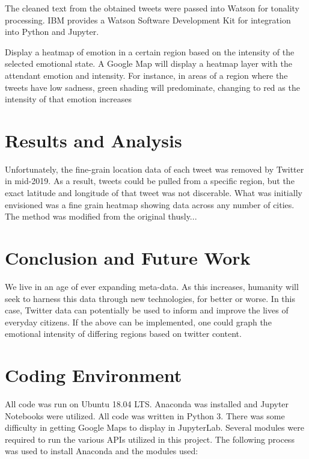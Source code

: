 \documentclass[12pt, oneside]{article}
\begin{document}
The cleaned text from the obtained tweets were passed into Watson for tonality
processing. IBM provides a Watson Software Development Kit for integration into
Python and Jupyter. 

Display a heatmap of emotion in a certain region based on the intensity
of the selected emotional state. A Google
Map will display a heatmap layer with the attendant emotion and intensity. For
instance, in areas of a region where the tweets have low sadness, green shading
will predominate, changing to red as the intensity of that emotion increases


\section{Results and Analysis}
Unfortunately, the fine-grain location data of
each tweet was removed by Twitter in mid-2019. As a result, tweets could be
pulled from a specific region, but the exact latitude and longitude of that
tweet was not discerable. What was initially envisioned was a fine grain heatmap
showing data across any number of cities. The method was modified from the original thusly...

\section{Conclusion and Future Work}
We live in an age of ever expanding meta-data. As this increases, humanity will
seek to harness this data through new technologies, for better or worse. In
this case, Twitter data can potentially be used to inform and improve the lives
of everyday citizens. If the above can be implemented, one could graph
the emotional intensity of differing regions based on twitter content.

\newpage{}


%


\newpage{}
\appendix{}
\section{Coding Environment}
All code was run on Ubuntu 18.04 LTS. Anaconda was installed and Jupyter
Notebooks were utilized. All code was written in Python 3. There was some
difficulty in getting Google Maps to display in JupyterLab. Several modules
were required to run the various APIs utilized in this project. The following process was used to install Anaconda and the modules used:
\end{document}

